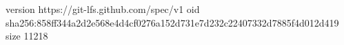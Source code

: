 version https://git-lfs.github.com/spec/v1
oid sha256:858ff344a2d2e568e4d4cf0276a152d731e7d232c22407332d7885f4d012d419
size 11218
